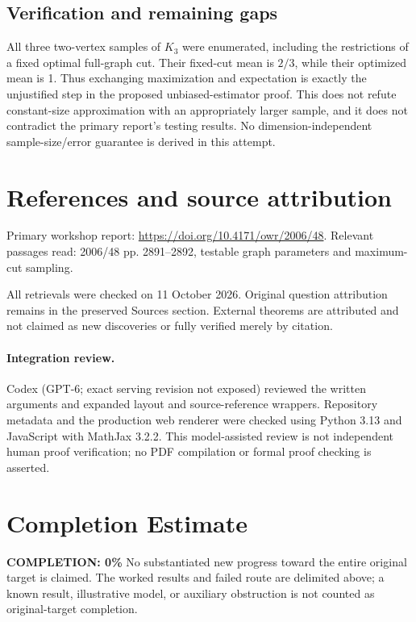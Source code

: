 \documentclass[11pt]{article}
\begin{document}
\subsection{Verification and remaining gaps}
All three two-vertex samples of $K_3$ were enumerated, including the restrictions of a fixed optimal full-graph cut. Their fixed-cut mean is $2/3$, while their optimized mean is 1. Thus exchanging maximization and expectation is exactly the unjustified step in the proposed unbiased-estimator proof. This does not refute constant-size approximation with an appropriately larger sample, and it does not contradict the primary report's testing results. No dimension-independent sample-size/error guarantee is derived in this attempt.

\section{References and source attribution}
Primary workshop report: \url{https://doi.org/10.4171/owr/2006/48}. Relevant passages read: 2006/48 pp. 2891--2892, testable graph parameters and maximum-cut sampling.

All retrievals were checked on 11 October 2026. Original question attribution remains in the preserved Sources section. External theorems are attributed and not claimed as new discoveries or fully verified merely by citation.


\paragraph{Integration review.} Codex (GPT-6; exact serving revision not exposed) reviewed the written arguments and expanded layout and source-reference wrappers. Repository metadata and the production web renderer were checked using Python 3.13 and JavaScript with MathJax 3.2.2. This model-assisted review is not independent human proof verification; no PDF compilation or formal proof checking is asserted.

\section{Completion Estimate}
\noindent\textbf{COMPLETION: 0\%}
No substantiated new progress toward the entire original target is claimed. The worked results and failed route are delimited above; a known result, illustrative model, or auxiliary obstruction is not counted as original-target completion.
\end{document}
